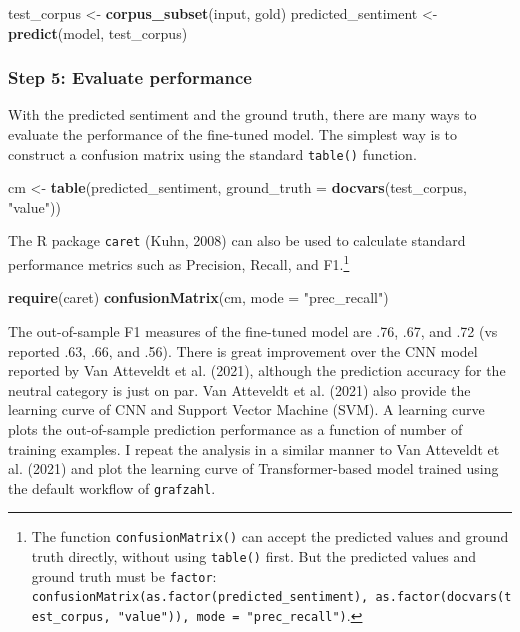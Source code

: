 \documentclass[
  english,
  man,floatsintext]{apa6}
\newenvironment{Shaded}{\begin{snugshade}}{\end{snugshade}}
\newcommand{\DataTypeTok}[1]{\textcolor[rgb]{0.13,0.29,0.53}{#1}}
\newcommand{\KeywordTok}[1]{\textcolor[rgb]{0.13,0.29,0.53}{\textbf{#1}}}
\newcommand{\NormalTok}[1]{#1}
\newcommand{\StringTok}[1]{\textcolor[rgb]{0.31,0.60,0.02}{#1}}
\begin{document}
\begin{Shaded}
\begin{Highlighting}[]
\NormalTok{test\_corpus \textless{}{-}}\StringTok{ }\KeywordTok{corpus\_subset}\NormalTok{(input, gold)}
\NormalTok{predicted\_sentiment \textless{}{-}}\StringTok{ }\KeywordTok{predict}\NormalTok{(model, test\_corpus)}
\end{Highlighting}
\end{Shaded}

\hypertarget{step-5-evaluate-performance}{%
\subsubsection{Step 5: Evaluate performance}\label{step-5-evaluate-performance}}

With the predicted sentiment and the ground truth, there are many ways to evaluate the performance of the fine-tuned model. The simplest way is to construct a confusion matrix using the standard \texttt{table()} function.

\begin{Shaded}
\begin{Highlighting}[]
\NormalTok{cm \textless{}{-}}\StringTok{ }\KeywordTok{table}\NormalTok{(predicted\_sentiment,}
            \DataTypeTok{ground\_truth =} \KeywordTok{docvars}\NormalTok{(test\_corpus, }\StringTok{"value"}\NormalTok{))}
\end{Highlighting}
\end{Shaded}

The R package \texttt{caret} (Kuhn, 2008) can also be used to calculate standard performance metrics such as Precision, Recall, and F1.\footnote{The function \texttt{confusionMatrix()} can accept the predicted values and ground truth directly, without using \texttt{table()} first. But the predicted values and ground truth must be \texttt{factor}: \texttt{confusionMatrix(as.factor(predicted\_sentiment),\ as.factor(docvars(test\_corpus,\ "value")),\ mode\ =\ "prec\_recall")}.}

\begin{Shaded}
\begin{Highlighting}[]
\KeywordTok{require}\NormalTok{(caret)}
\KeywordTok{confusionMatrix}\NormalTok{(cm, }\DataTypeTok{mode =} \StringTok{"prec\_recall"}\NormalTok{)}
\end{Highlighting}
\end{Shaded}

The out-of-sample F1 measures of the fine-tuned model are .76, .67, and .72 (vs reported .63, .66, and .56). There is great improvement over the CNN model reported by Van Atteveldt et al. (2021), although the prediction accuracy for the neutral category is just on par. Van Atteveldt et al. (2021) also provide the learning curve of CNN and Support Vector Machine (SVM). A learning curve plots the out-of-sample prediction performance as a function of number of training examples. I repeat the analysis in a similar manner to Van Atteveldt et al. (2021) and plot the learning curve of Transformer-based model trained using the default workflow of \texttt{grafzahl}.
\end{document}
